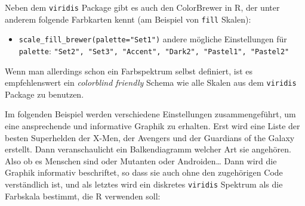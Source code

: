 \documentclass[
  ngerman,
]{book}
\providecommand{\tightlist}{%
  \setlength{\itemsep}{0pt}\setlength{\parskip}{0pt}}
\begin{document}
Neben dem \texttt{viridis} Package gibt es auch den ColorBrewer in R, der unter anderem folgende Farbkarten kennt (am Beispiel von \texttt{fill} Skalen):

\begin{itemize}
\tightlist
\item
  \texttt{scale\_fill\_brewer(palette="Set1")} andere mögliche Einstellungen für \texttt{palette}: \texttt{"Set2",\ "Set3",\ "Accent",\ "Dark2",\ "Pastel1",\ "Pastel2"}
\end{itemize}

Wenn man allerdings schon ein {Farbspektrum} selbst definiert, ist es empfehlenswert ein \emph{colorblind friendly} Schema wie alle Skalen aus dem \texttt{viridis} Package zu benutzen.

Im folgenden Beispiel werden verschiedene Einstellungen zusammengeführt, um eine ansprechende und informative Graphik zu erhalten. Erst wird eine Liste der besten Superhelden der X-Men, der Avengers und der Guardians of the Galaxy erstellt. Dann veranschaulicht ein {Balkendiagramm} welcher Art sie angehören. Also ob es Menschen sind oder Mutanten oder Androiden\ldots{} Dann wird die Graphik informativ {beschriftet}, so dass sie auch ohne den zugehörigen Code verständlich ist, und als letztes wird ein diskretes {\texttt{viridis} Spektrum} als die {Farbskala} bestimmt, die R verwenden soll:
\end{document}
